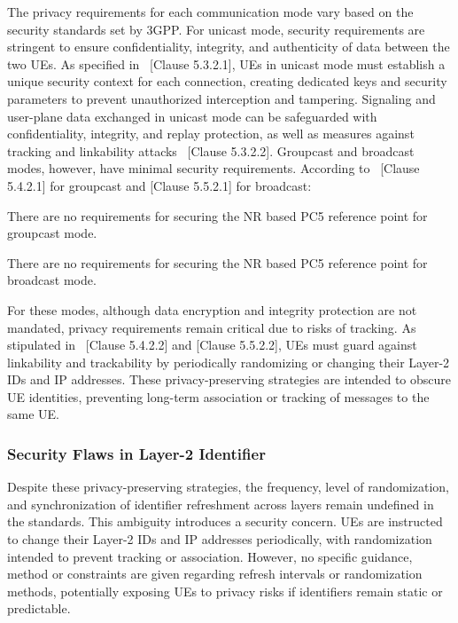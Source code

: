 The privacy requirements for each communication mode vary based on the security standards set by 3GPP. For unicast mode, security requirements are stringent to ensure confidentiality, integrity, and authenticity of data between the two UEs. As specified in~\cite{3gpp.33.536} [Clause 5.3.2.1], UEs in unicast mode must establish a unique security context for each connection, creating dedicated keys and security parameters to prevent unauthorized interception and tampering. Signaling and user-plane data exchanged in unicast mode can be safeguarded with confidentiality, integrity, and replay protection, as well as measures against tracking and linkability attacks~\cite{3gpp.33.536} [Clause 5.3.2.2]. Groupcast and broadcast modes, however, have minimal security requirements. According to~\cite{3gpp.33.536} [Clause 5.4.2.1] for groupcast and [Clause 5.5.2.1] for broadcast:

\begin{fancyquote}[]
There are no requirements for securing the NR based PC5 reference point for groupcast mode.
\end{fancyquote}

\begin{fancyquote}[]
There are no requirements for securing the NR based PC5 reference point for broadcast mode.
\end{fancyquote}

For these modes, although data encryption and integrity protection are not mandated, privacy requirements remain critical due to risks of tracking. As stipulated in~\cite{3gpp.33.536} [Clause 5.4.2.2] and [Clause 5.5.2.2], UEs must guard against linkability and trackability by periodically randomizing or changing their Layer-2 IDs and IP addresses. These privacy-preserving strategies are intended to obscure UE identities, preventing long-term association or tracking of messages to the same UE.

\subsubsection{Security Flaws in Layer-2 Identifier}

Despite these privacy-preserving strategies, the frequency, level of randomization, and synchronization of identifier refreshment across layers remain undefined in the standards. This ambiguity introduces a security concern. UEs are instructed to change their Layer-2 IDs and IP addresses periodically, with randomization intended to prevent tracking or association. However, no specific guidance, method or constraints are given regarding refresh intervals or randomization methods, potentially exposing UEs to privacy risks if identifiers remain static or predictable.

